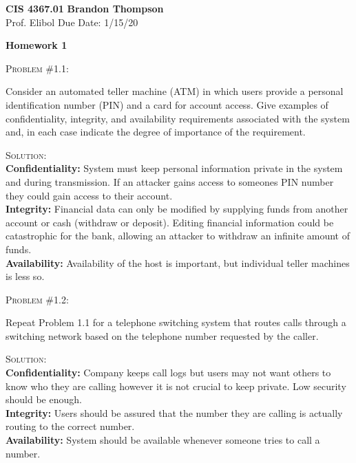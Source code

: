 \documentclass[12pt]{article}
\newenvironment{problem}[1]
{\begin{mdframed}[linewidth=0.6pt]
        \textsc{Problem #1:}

}
    {\end{mdframed}}
\newenvironment{solution}
    {\textsc{Solution:}\\}
    {\newpage}%
\begin{document}
\noindent
\textbf{CIS 4367.01} \hfill \textbf{Brandon Thompson} \\
\normalsize Prof. Elibol \hfill Due Date: 1/15/20 \\

\begin{center}
\textbf{Homework 1}
\end{center}
	\begin{problem}{\#1.1}
		Consider an automated teller machine (ATM) in which users provide a personal
		identification number (PIN) and a card for account access. Give examples of
		confidentiality, integrity, and availability requirements
		associated with the system and, in each case indicate the degree of importance
		of the requirement.
	\end{problem}
	\begin{solution}
		\textbf{Confidentiality:} System must keep personal information private
		in the system and during transmission. If an attacker gains access
		to someones PIN number they could gain access to their account.\\
		\textbf{Integrity:} Financial data can only be modified by supplying funds
		from another account or cash (withdraw or deposit). Editing financial
		information could be catastrophic for the bank, allowing an attacker to
		withdraw an infinite amount of funds.\\
		\textbf{Availability:} Availability of the host is important, but
		individual teller machines is less so.
	\end{solution}

	\begin{problem}{\#1.2}
		Repeat Problem 1.1 for a telephone switching system that routes calls through a
		switching network based on the telephone number requested by the caller.
	\end{problem}
	\begin{solution}
		\textbf{Confidentiality:} Company keeps call logs but
		users may not want others to know who they are calling however it is not 
		crucial to keep private. Low security should be enough.\\
		\textbf{Integrity:} Users should be assured that the number they are calling
		is actually routing to the correct number.\\
		\textbf{Availability:} System should be available whenever someone tries
		to call a number.
	\end{solution}
\end{document}
